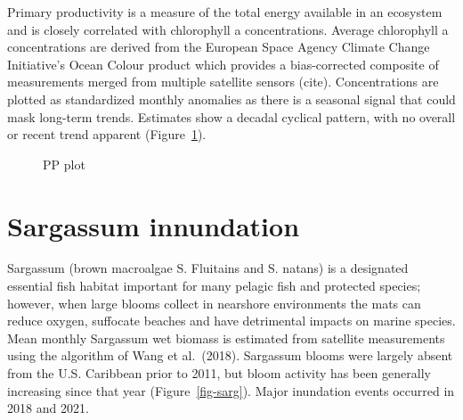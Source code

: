 \documentclass[
  letterpaper,
  oneside,
  open=any]{scrbook}
\begin{document}
Primary productivity is a measure of the total energy available in an
ecosystem and is closely correlated with chlorophyll a concentrations.
Average chlorophyll a concentrations are derived from the European Space
Agency Climate Change Initiative's Ocean Colour product which provides a
bias-corrected composite of measurements merged from multiple satellite
sensors (cite). Concentrations are plotted as standardized monthly
anomalies as there is a seasonal signal that could mask long-term
trends. Estimates show a decadal cyclical pattern, with no overall or
recent trend apparent (Figure~\ref{fig-chl}).

\begin{figure}


\caption{\label{fig-chl}PP plot}

\end{figure}%

\section{Sargassum innundation}\label{sargassum-innundation}

Sargassum (brown macroalgae S. Fluitains and S. natans) is a designated
essential fish habitat important for many pelagic fish and protected
species; however, when large blooms collect in nearshore environments
the mats can reduce oxygen, suffocate beaches and have detrimental
impacts on marine species. Mean monthly Sargassum wet biomass is
estimated from satellite measurements using the algorithm of Wang et
al.~(2018). Sargassum blooms were largely absent from the U.S. Caribbean
prior to 2011, but bloom activity has been generally increasing since
that year (Figure~\ref{fig-sarg}). Major inundation events occurred in
2018 and 2021.
\end{document}
